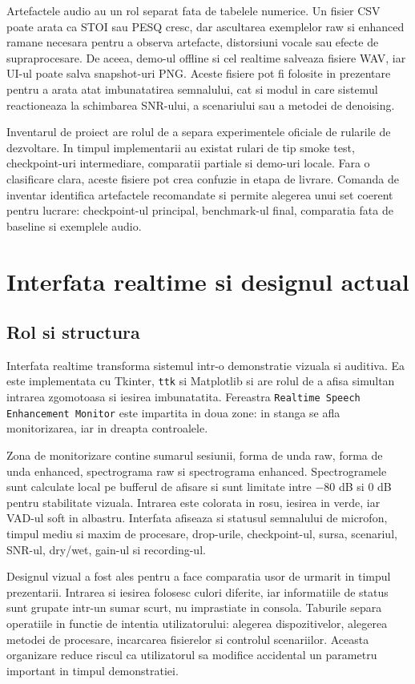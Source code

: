 \documentclass[12pt,a4paper]{report}
\begin{document}
Artefactele audio au un rol separat fata de tabelele numerice. Un fisier CSV
poate arata ca STOI sau PESQ cresc, dar ascultarea exemplelor raw si enhanced
ramane necesara pentru a observa artefacte, distorsiuni vocale sau efecte de
supraprocesare. De aceea, demo-ul offline si cel realtime salveaza fisiere WAV,
iar UI-ul poate salva snapshot-uri PNG. Aceste fisiere pot fi folosite in
prezentare pentru a arata atat imbunatatirea semnalului, cat si modul in care
sistemul reactioneaza la schimbarea SNR-ului, a scenariului sau a metodei de
denoising.

Inventarul de proiect are rolul de a separa experimentele oficiale de rularile
de dezvoltare. In timpul implementarii au existat rulari de tip smoke test,
checkpoint-uri intermediare, comparatii partiale si demo-uri locale. Fara o
clasificare clara, aceste fisiere pot crea confuzie in etapa de livrare.
Comanda de inventar identifica artefactele recomandate si permite alegerea unui
set coerent pentru lucrare: checkpoint-ul principal, benchmark-ul final,
comparatia fata de baseline si exemplele audio.

\chapter{Interfata realtime si designul actual}

\section{Rol si structura}

Interfata realtime transforma sistemul intr-o demonstratie vizuala si auditiva.
Ea este implementata cu Tkinter, \texttt{ttk} si Matplotlib si are rolul de a
afisa simultan intrarea zgomotoasa si iesirea imbunatatita. Fereastra
\texttt{Realtime Speech Enhancement Monitor} este impartita in doua zone: in
stanga se afla monitorizarea, iar in dreapta controalele.

Zona de monitorizare contine sumarul sesiunii, forma de unda raw, forma de unda
enhanced, spectrograma raw si spectrograma enhanced. Spectrogramele sunt
calculate local pe bufferul de afisare si sunt limitate intre \(-80\) dB si
\(0\) dB pentru stabilitate vizuala. Intrarea este colorata in rosu, iesirea in
verde, iar VAD-ul soft in albastru. Interfata afiseaza si statusul semnalului
de microfon, timpul mediu si maxim de procesare, drop-urile, checkpoint-ul,
sursa, scenariul, SNR-ul, dry/wet, gain-ul si recording-ul.

Designul vizual a fost ales pentru a face comparatia usor de urmarit in timpul
prezentarii. Intrarea si iesirea folosesc culori diferite, iar informatiile de
status sunt grupate intr-un sumar scurt, nu imprastiate in consola. Taburile
separa operatiile in functie de intentia utilizatorului: alegerea dispozitivelor,
alegerea metodei de procesare, incarcarea fisierelor si controlul scenariilor.
Aceasta organizare reduce riscul ca utilizatorul sa modifice accidental un
parametru important in timpul demonstratiei.
\end{document}
